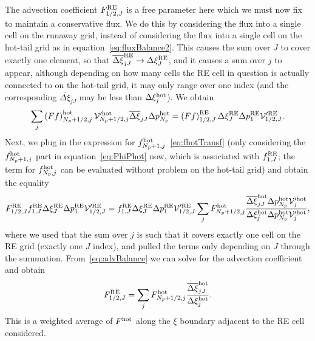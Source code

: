 \documentclass{notes}
\newcommand{\Vp}{\mathcal{V}'}
\begin{document}
    The advection coefficient $F^{\rm RE}_{1/2,J}$ is a free parameter here
    which we must now fix to maintain a conservative flux. We do this by
    considering the flux into a single cell on the runaway grid, instead of
    considering the flux into a single cell on the hot-tail grid as in
    equation~\eqref{eq:fluxBalance2}. This causes the sum over $J$ to cover
    exactly one element, so that $\overline{\Delta\xi}_{jJ}^{\rm RE}\to\Delta\xi_J^{\rm RE}$,
    and it causes a sum over $j$ to appear, although depending on how many cells
    the RE cell in question is actually connected to on the hot-tail grid, it
    may only range over one index (and the corresponding
    $\overline{\Delta\xi}_{jJ}$ may be less than $\Delta\xi^{\rm hot}_j$). We
    obtain
    \begin{equation}
        \sum_j \left( Ff \right)^{\rm hot}_{N_p+1/2,j} \Vp^{\rm hot}_{N_p+1/2,j} \overline{\Delta\xi}_{jJ}\Delta p_{N_p}^{\rm hot} =
        \left( F f \right)^{\rm RE}_{1/2,J} \Delta\xi^{\rm RE}_J\Delta p_1^{\rm RE} \Vp^{\rm RE}_{1/2,J}.
    \end{equation}
    Next, we plug in the expression for
    $f^{\rm hot}_{N_p+1,j}$~\eqref{eq:fhotTransf} (only considering the
    $f^{\rm hot}_{N_p+1,j}$ part in equation~\eqref{eq:PhiPhot} now, which is
    associated with $f^{\rm RE}_{1,J}$; the term for $f^{\rm hot}_{N_p,j}$ can be
    evaluated without problem on the hot-tail grid) and obtain the equality
    \begin{equation}\label{eq:advBalance}
        F^{\rm RE}_{1/2,J} f^{\rm RE}_{1,J} \Delta\xi^{\rm RE}_J\Delta p_1^{\rm RE} \Vp^{\rm RE}_{1/2,J} =
        f_{1,J}^{\rm RE}\Delta\xi^{\rm RE}_J\Delta p_1^{\rm RE}\Vp^{\rm RE}_{1/2,J}
        \sum_j F^{\rm hot}_{N_p+1/2,j} \frac{\overline{\Delta\xi}^{\rm hot}_{jJ}\Delta p_{N_p}^{\rm hot}\Vp^{\rm hot}_j}
        {\Delta\xi^{\rm hot}_j\Delta p_{N_p}^{\rm hot}\Vp^{\rm hot}_j},
    \end{equation}
    where we used that the sum over $j$ is such that it covers exactly one
    cell on the RE grid (exactly one $J$ index), and pulled the terms only
    depending on $J$ through the summation. From~\eqref{eq:advBalance} we can
    solve for the advection coefficient and obtain
    \begin{equation}\label{eq:avAdvection}
        F_{1/2,J}^{\rm RE} = \sum_j F^{\rm hot}_{N_p+1/2,j}
        \frac{\overline{\Delta\xi}^{\rm hot}_{jJ}}{\Delta\xi_j^{\rm hot}}.
    \end{equation}
    This is a weighted average of $F^{\rm hot}$ along the $\xi$ boundary
    adjacent to the RE cell considered.
\end{document}
